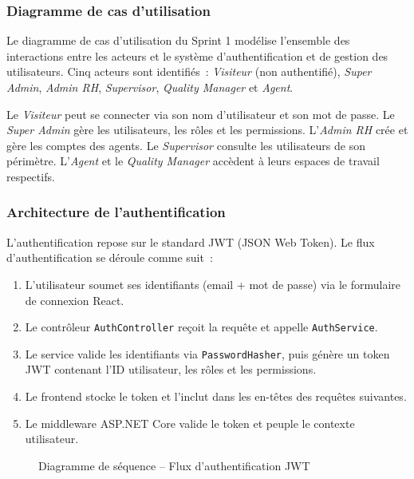 \subsubsection{Diagramme de cas d'utilisation}

Le diagramme de cas d'utilisation du Sprint 1 modélise l'ensemble des interactions entre les
acteurs et le système d'authentification et de gestion des utilisateurs. Cinq acteurs sont
identifiés~: \textit{Visiteur} (non authentifié), \textit{Super Admin}, \textit{Admin RH},
\textit{Supervisor}, \textit{Quality Manager} et \textit{Agent}.

Le \textit{Visiteur} peut se connecter via son nom d'utilisateur et son mot de passe. Le
\textit{Super Admin} gère les utilisateurs, les rôles et les permissions. L'\textit{Admin RH}
crée et gère les comptes des agents. Le \textit{Supervisor} consulte les utilisateurs de son
périmètre. L'\textit{Agent} et le \textit{Quality Manager} accèdent à leurs espaces de
travail respectifs.

\subsubsection{Architecture de l'authentification}

L'authentification repose sur le standard JWT (JSON Web Token). Le flux d'authentification se
déroule comme suit~:

\begin{enumerate}
    \item L'utilisateur soumet ses identifiants (email + mot de passe) via le formulaire de
    connexion React.
    \item Le contrôleur \texttt{AuthController} reçoit la requête et appelle
    \texttt{AuthService}.
    \item Le service valide les identifiants via \texttt{PasswordHasher}, puis génère un
    token JWT contenant l'ID utilisateur, les rôles et les permissions.
    \item Le frontend stocke le token et l'inclut dans les en-têtes des requêtes suivantes.
    \item Le middleware ASP.NET Core valide le token et peuple le contexte utilisateur.
\end{enumerate}

\begin{figure}[H]
    \centering
    \caption{Diagramme de séquence -- Flux d'authentification JWT}
    \label{fig:sprint1_auth_flow}
\end{figure}

